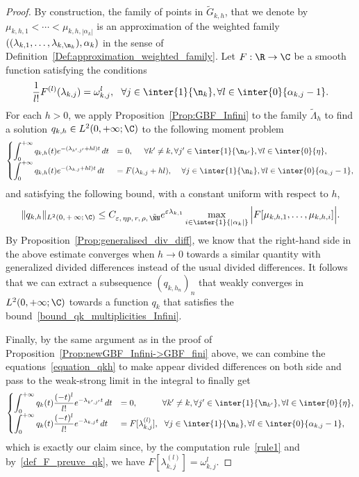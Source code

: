 \begin{proof}
By construction, the family of points in $\widetilde{G}_{k,h}$, that we denote by $\mu_{k,h,1} < \dotsm < \mu_{k,h,|\alpha_k|}$ is an approximation of the weighted family $((\lambda_{k,1},\dotsc,\lambda_{k,\n_k}), \alpha_k)$ in the sense of Definition~\ref{Def:approximation_weighted_family}. Let $F:\R\to \C$ be a smooth function satisfying the conditions
\begin{equation}\label{def_F_preuve_qk}
\frac{1}{l!} F^{(l)} (\lambda_{k,j}) = \omega_{k,j}^l, \ \ \forall j\in \inter{1}{\n_k}, \forall l\in \inter{0}{\alpha_{k,j}-1}.
\end{equation}
For each $h>0$, we apply Proposition~\ref{Prop:GBF_Infini} to the family $\tilde{\Lambda}_h$ to find a solution $q_{k,h}\in L^2(0,+\infty;\C)$ to the following moment problem
\begin{equation}\label{equation_qkh}
\begin{cases}
\displaystyle\int_0^{+\infty} q_{k,h}(t) e^{-(\lambda_{k',j'} + hl) t} \, dt & = 0, \mkern25mu \forall k'\neq k, \forall j'\in \inter{1}{\n_{k'}}, \forall l\in \inter{0}{\eta},\\[0.15em]
\displaystyle\int_0^{+\infty} q_{k,h}(t) e^{-(\lambda_{k,j}+hl) t} \, dt & = F(\lambda_{k,j}+hl), \quad\, \forall j\in \inter{1}{\n_{k}}, \forall l\in \inter{0}{\alpha_{k,j}-1},
\end{cases}
\end{equation}
and satisfying the following bound, with a constant uniform with respect to $h$,
\[
\|q_{k,h}\|_{L^2(0,\,+\,\infty;\,\C)} \leq C_{\varepsilon,\, \eta p,\,r,\, \rho,\, \tilde{\NN}} e^{\varepsilon \lambda_{k,1}} \max \limits_{i\in \inter{1}{|\alpha_k|}} \Big| F[\mu_{k,h,1}, \dots, \mu_{k,h,i}] \Big|.
\]
By Proposition~\ref{Prop:generalised_div_diff}, we know that the right-hand side in the above estimate converges when $h\to 0$ towards a similar quantity with generalized divided differences instead of the usual divided differences. It follows that we can extract a subsequence $(q_{k,h_n})_n$ that weakly converges in $L^2(0,+\infty;\C)$ towards a function $q_k$ that satisfies the bound~\eqref{bound_qk_multiplicities_Infini}.

Finally, by the same argument as in the proof of Proposition~\ref{Prop:newGBF_Infini->GBF_fini} above, we can combine the equations~\eqref{equation_qkh} to make appear divided differences on both side and pass to the weak-strong limit in the integral to finally get
\begin{equation*}\label{equation_qk}
\begin{cases}
\displaystyle\int_0^{+\infty} q_{k}(t) \frac{(-t)^l}{l!} e^{-\lambda_{k',j'}t} \, dt & = 0, \mkern53mu \forall k'\neq k, \forall j'\in \inter{1}{\n_{k'}}, \forall l\in \inter{0}{\eta},\\[0.15em]
\displaystyle\int_0^{+\infty} q_{k}(t) \frac{(-t)^l}{l!} e^{-\lambda_{k,j}t} \, dt & = F[\lambda_{k,j}^{(l)}], \ \ \forall j\in \inter{1}{\n_{k}}, \forall l\in \inter{0}{\alpha_{k,j}-1},
\end{cases}
\end{equation*}
which is exactly our claim since, by the computation rule~\eqref{rule1} and by~\eqref{def_F_preuve_qk}, we have $F[\lambda_{k,j}^{(l)}] = \omega_{k,j}^l$.
\end{proof}
